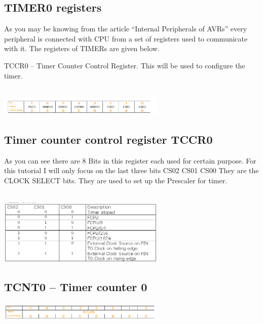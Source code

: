 \subsection{TIMER0 registers}
As you may be knowing from the article “Internal Peripherals of AVRs” every peripheral is connected with CPU from a set of registers used to communicate with it. The registers of TIMERs are given below.

TCCR0 – Timer Counter Control Register. This will be used to configure the timer.
\\\\
\centerline{
	\includegraphics[width=0.6\textwidth]{overview/images/timer3.png}
}

\newpage
\subsection{Timer counter control register TCCR0}
As you can see there are 8 Bits in this register each used for certain purpose. For this tutorial I will only focus on the last three bits CS02 CS01 CS00 They are the CLOCK SELECT bits. They are used to set up the Prescaler for timer.
\\\\
\centerline{
	\includegraphics[width=0.6\textwidth]{overview/images/timer4.png}
}

\subsection{TCNT0 – Timer counter 0}
\centerline{
	\includegraphics[width=0.6\textwidth]{overview/images/timer5.png}
}

